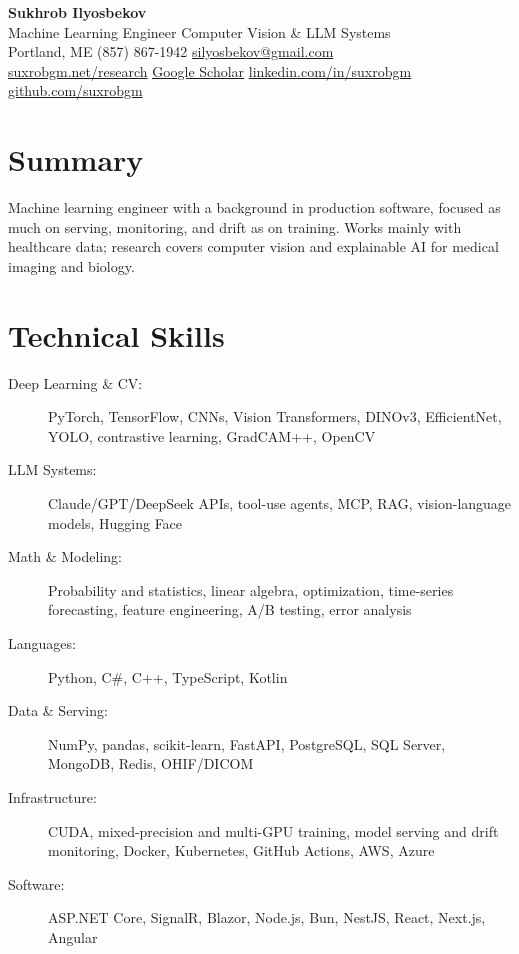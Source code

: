 \documentclass[letterpaper,11pt]{article}
\begin{document}
\begin{center}
    {\Huge\bfseries\color{darktext} Sukhrob Ilyosbekov}\vspace{4pt}\\
    {\large\color{accent} Machine Learning Engineer \enspace\textperiodcentered\enspace Computer Vision \& LLM Systems}\vspace{8pt}\\
    {\color{lighttext}
    \faMapMarker*\enspace Portland, ME \quad
    \faPhone\enspace(857) 867-1942 \quad
    \faEnvelope\enspace\href{mailto:silyosbekov@gmail.com}{silyosbekov@gmail.com}
    }\vspace{3pt}\\
    {\color{lighttext}
    \faGlobe\enspace\href{https://suxrobgm.net/research}{suxrobgm.net/research} \quad
    \faGraduationCap\enspace\href{https://scholar.google.com/citations?user=p7ujRHoAAAAJ}{Google Scholar} \quad
    \faLinkedin\enspace\href{https://www.linkedin.com/in/suxrobgm}{linkedin.com/in/suxrobgm} \quad
    \faGithub\enspace\href{https://github.com/suxrobgm}{github.com/suxrobgm}
    }
\end{center}

\section{Summary}
Machine learning engineer with a background in production software, focused as much on serving, monitoring, and drift as on training. Works mainly with healthcare data; research covers computer vision and explainable AI for medical imaging and biology.

\section{Technical Skills}
\begin{description}
    \item[Deep Learning \& CV:] PyTorch, TensorFlow, CNNs, Vision Transformers, DINOv3, EfficientNet, YOLO, contrastive learning, GradCAM++, OpenCV
    \item[LLM Systems:] Claude/GPT/DeepSeek APIs, tool-use agents, MCP, RAG, vision-language models, Hugging Face
    \item[Math \& Modeling:] Probability and statistics, linear algebra, optimization, time-series forecasting, feature engineering, A/B testing, error analysis
    \item[Languages:] Python, C\#, C++, TypeScript, Kotlin
    \item[Data \& Serving:] NumPy, pandas, scikit-learn, FastAPI, PostgreSQL, SQL Server, MongoDB, Redis, OHIF/DICOM
    \item[Infrastructure:] CUDA, mixed-precision and multi-GPU training, model serving and drift monitoring, Docker, Kubernetes, GitHub Actions, AWS, Azure
    \item[Software:] ASP.NET Core, SignalR, Blazor, Node.js, Bun, NestJS, React, Next.js, Angular
\end{description}
\end{document}
